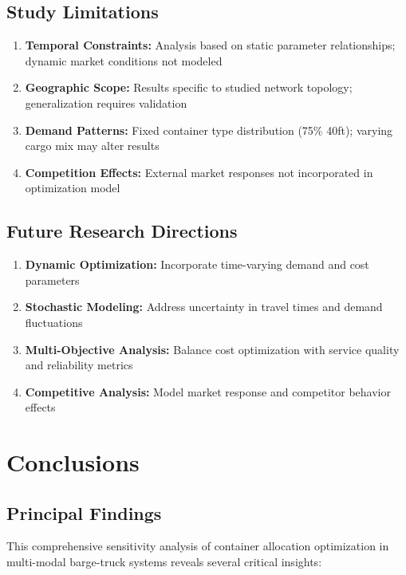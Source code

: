 \documentclass[12pt,a4paper]{article}
\begin{document}
\subsection{Study Limitations}

\begin{enumerate}
    \item \textbf{Temporal Constraints:} Analysis based on static parameter relationships; dynamic market conditions not modeled
    \item \textbf{Geographic Scope:} Results specific to studied network topology; generalization requires validation
    \item \textbf{Demand Patterns:} Fixed container type distribution (75\% 40ft); varying cargo mix may alter results
    \item \textbf{Competition Effects:} External market responses not incorporated in optimization model
\end{enumerate}

\subsection{Future Research Directions}

\begin{enumerate}
    \item \textbf{Dynamic Optimization:} Incorporate time-varying demand and cost parameters
    \item \textbf{Stochastic Modeling:} Address uncertainty in travel times and demand fluctuations
    \item \textbf{Multi-Objective Analysis:} Balance cost optimization with service quality and reliability metrics
    \item \textbf{Competitive Analysis:} Model market response and competitor behavior effects
\end{enumerate}

\section{Conclusions}

\subsection{Principal Findings}

This comprehensive sensitivity analysis of container allocation optimization in multi-modal barge-truck systems reveals several critical insights:
\end{document}
